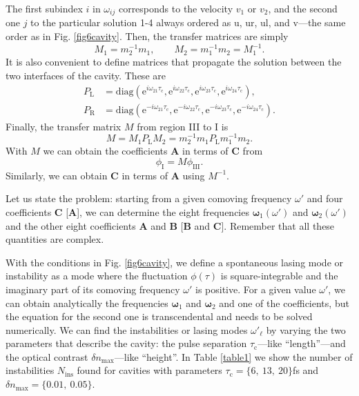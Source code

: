 \documentclass[aps,pra,reprint,amsmath,amssymb,showpacs,groupedaddress,floatfix]{revtex4-1}
\begin{document}
The first subindex $i$ in $\omega_{ij}$ corresponds to the velocity $v_1$ or $v_2$, and the second one $j$ to the particular solution 1-4 always ordered as u, ur, ul, and v---the same order as in Fig. \ref{fig6cavity}. Then, the transfer matrices are simply
\begin{equation}
M_1=m_2^{-1} m_1, \qquad M_2=m_1^{-1} m_2=M_1^{-1}.
\end{equation}
It is also convenient to define matrices that propagate the solution between the two interfaces of the cavity. These are
\begin{align}
P_\text{L}&=\text{diag}(\text{e}^{i\omega_{21}\tau_\text{c}},\text{e}^{i\omega_{22}\tau_\text{c}},\text{e}^{i\omega_{23}\tau_\text{c}},\text{e}^{i\omega_{24}\tau_\text{c}}),\\
P_\text{R}&=\text{diag}(\text{e}^{-i\omega_{21}\tau_\text{c}},\text{e}^{-i\omega_{22}\tau_\text{c}},\text{e}^{-i\omega_{23}\tau_\text{c}},\text{e}^{-i\omega_{24}\tau_\text{c}}).
\end{align}
Finally, the transfer matrix $M$ from region III to I is
\begin{equation}\label{matrizM}
M=M_1P_\text{L}M_2=m_2^{-1}m_1P_\text{L}m_1^{-1}m_2.
\end{equation}
With $M$ we can obtain the coefficients $\textbf{A}$ in terms of $\textbf{C}$ from
\begin{equation}
\phi_\text{I}=M\phi_\text{III}.
\end{equation} 
Similarly, we can obtain  $\textbf{C}$ in terms of $\textbf{A}$ using $M^{-1}$.

Let us state the problem: starting from a given comoving frequency $\omega'$ and four coefficients $\textbf{C}$ [$\textbf{A}$], we can determine the eight frequencies ${\boldsymbol\omega}_1(\omega')$ and ${\boldsymbol\omega}_2(\omega')$ and the other eight coefficients $\textbf{A}$ and $\textbf{B}$ [$\textbf{B}$ and $\textbf{C}$]. Remember that all these quantities are complex.

With the conditions in Fig. \ref{fig6cavity}, we define a spontaneous lasing mode or instability as a mode where the fluctuation $\phi(\tau)$ is square-integrable and the imaginary part of its comoving frequency $\omega'$ is positive. For a given value $\omega'$, we can obtain analytically the frequencies ${\boldsymbol\omega}_1$ and ${\boldsymbol\omega}_2$ and one of the coefficients, but the equation for the second one is transcendental and needs to be solved numerically. We can find the instabilities or lasing modes $\omega'_\ell$ by varying the two parameters that describe the cavity: the pulse separation $\tau_\text{c}$---like ``length''---and the optical contrast $\delta n_\text{max}$---like ``height''. In Table \ref{table1} we show the number of instabilities $N_\text{ins}$ found for cavities with parameters $\tau_\text{c}=\{6,\ 13,\ 20\}$fs and $\delta n_{\text{max}}=\{0.01, \ 0.05\}$.
\end{document}

